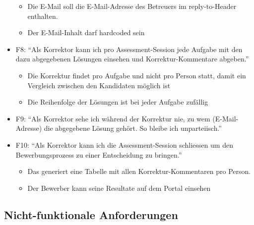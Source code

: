 \begin{itemize}
          \begin{itemize}
              \item Die E-Mail soll die E-Mail-Adresse des Betreuers im reply-to-Header enthalten.
              \item Der E-Mail-Inhalt darf hardcoded sein
          \end{itemize}
    \item F8: \enquote{Als Korrektor kann ich pro Assessment-Session jede Aufgabe mit den dazu abgegebenen Lösungen einsehen und Korrektur-Kommentare abgeben.}
          \begin{itemize}
              \item Die Korrektur findet pro Aufgabe und nicht pro Person statt, damit ein Vergleich zwischen den Kandidaten möglich ist
              \item Die Reihenfolge der Lösungen ist bei jeder Aufgabe zufällig
          \end{itemize}
    \item F9: \enquote{Als Korrektor sehe ich während der Korrektur nie, zu wem (E-Mail-Adresse) die abgegebene Lösung gehört. So bleibe ich unparteiisch.}
    \item F10: \enquote{Als Korrektor kann ich die Assessment-Session schliessen um den Bewerbungsprozess zu einer Entscheidung zu bringen.}
          \begin{itemize}
              \item Das generiert eine Tabelle mit allen Korrektur-Kommentaren pro Person.
              \item Der Bewerber kann seine Resultate auf dem Portal einsehen
          \end{itemize}
\end{itemize}

\newpage

\subsection{Nicht-funktionale Anforderungen}

